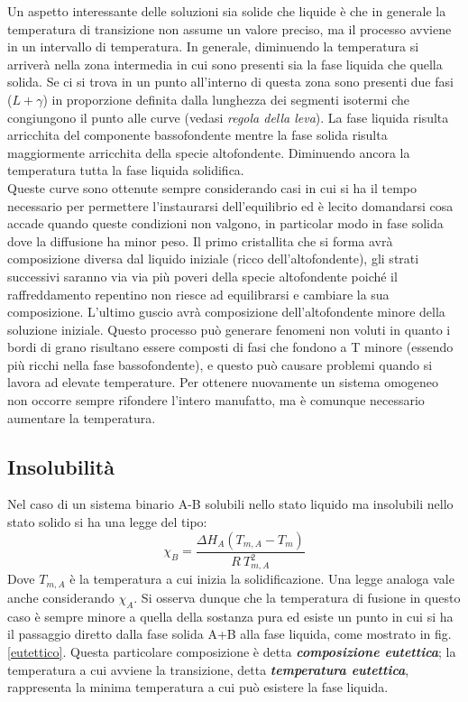 Un aspetto interessante delle soluzioni sia solide che liquide è che in generale la temperatura di transizione non assume un valore preciso, ma il processo avviene in un intervallo di temperatura. In generale, diminuendo la temperatura si arriverà nella zona intermedia in cui sono presenti sia la fase liquida che quella solida.
Se ci si trova in un punto all'interno di questa zona sono presenti due fasi ($L+\gamma$) in proporzione definita dalla lunghezza dei segmenti isotermi che congiungono il punto alle curve (vedasi \textit{regola della leva}). La fase liquida risulta arricchita del componente bassofondente mentre la fase solida risulta maggiormente arricchita della specie altofondente. Diminuendo ancora la temperatura tutta la fase liquida solidifica.\\
Queste curve sono ottenute sempre considerando casi in cui si ha il tempo necessario per permettere l'instaurarsi dell'equilibrio ed è lecito domandarsi cosa accade quando queste condizioni non valgono, in particolar modo in fase solida dove la diffusione ha minor peso. Il primo cristallita che si forma avrà composizione diversa dal liquido iniziale (ricco dell'altofondente), gli strati successivi saranno via via più poveri della specie altofondente poiché il raffreddamento repentino non riesce ad equilibrarsi e cambiare la sua composizione. L'ultimo guscio avrà composizione dell'altofondente minore della soluzione iniziale. Questo processo può generare fenomeni non voluti in quanto i bordi di grano risultano essere composti di fasi che fondono a T minore (essendo più ricchi nella fase bassofondente), e questo può causare problemi quando si lavora ad elevate temperature. Per ottenere nuovamente un sistema omogeneo non occorre sempre rifondere l'intero manufatto, ma è comunque necessario aumentare la temperatura.

\subsection{Insolubilità}

Nel caso di un sistema binario A-B solubili nello stato liquido ma insolubili nello stato solido si ha una legge del tipo:
\begin{equation}
    \chi_B=\frac{\Delta H_A(T_{m,A}-T_m)}{R \ T^2_{m,A}}
\end{equation}
Dove $T_{m,A}$ è la temperatura a cui inizia la solidificazione. Una legge analoga vale anche considerando $\chi_A$. Si osserva dunque che la temperatura di fusione in questo caso è sempre minore a quella della sostanza pura ed esiste un punto in cui si ha il passaggio diretto dalla fase solida A+B alla fase liquida, come mostrato in fig. \ref{eutettico}. Questa particolare composizione è detta \textit{\textbf{composizione eutettica}}; la temperatura a cui avviene la transizione, detta \textbf{\textit{temperatura eutettica}}, rappresenta la minima temperatura a cui può esistere la fase liquida.

